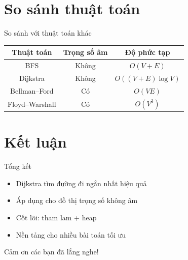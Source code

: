 \documentclass[aspectratio=169]{beamer}
\begin{document}
\section{So sánh thuật toán}

\begin{frame}{So sánh với thuật toán khác}

\small
\begin{center}
\begin{tabular}{c|c|c}
Thuật toán & Trọng số âm & Độ phức tạp \\
\hline
BFS & Không & $O(V+E)$ \\
Dijkstra & Không & $O((V+E)\log V)$ \\
Bellman--Ford & Có & $O(VE)$ \\
Floyd--Warshall & Có & $O(V^3)$ \\
\end{tabular}
\end{center}

\end{frame}

\section{Kết luận}

\begin{frame}{Tổng kết}

\begin{itemize}
\item Dijkstra tìm đường đi ngắn nhất hiệu quả
\item Áp dụng cho đồ thị trọng số không âm
\item Cốt lõi: tham lam + heap
\item Nền tảng cho nhiều bài toán tối ưu
\end{itemize}

\end{frame}

\begin{frame}
\centering
\Huge
Cảm ơn các bạn đã lắng nghe!
\end{frame}

\end{document}
